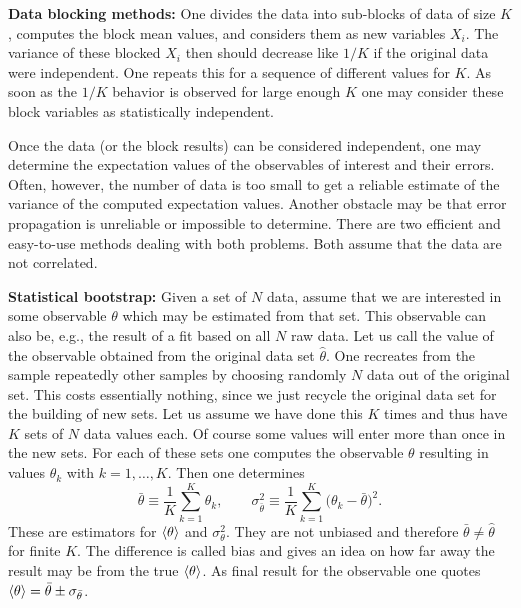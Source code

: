 \textbf{Data blocking methods:} One divides the data into sub-blocks of data of
size $K$, computes the block mean values, and considers them as new variables $X_i$. The variance of these blocked $X_i$ then should decrease like $1/K$
if the original data were independent. One repeats this for a sequence
of different values for $K$. As soon as the $1/K$ behavior is observed for
large enough $K$ one may consider these block variables as statistically
independent.

Once the data (or the block results) can be considered independent, one
may determine the expectation values of the observables of interest and their
errors. Often, however, the number of data is too small to get a reliable estimate of the variance of the computed expectation values. Another obstacle
may be that error propagation is unreliable or impossible to determine. There
are two efficient and easy-to-use methods dealing with both problems. Both
assume that the data are not correlated.

\textbf{Statistical bootstrap:} Given a set of $N$ data, assume that we are interested
in some observable $\theta$ which may be estimated from that set. This observable can also be, e.g., the result of a fit based on all $N$ raw data. Let us
call the value of the observable obtained from the original data set $\hat{\theta}$.
One recreates from the sample repeatedly other samples by choosing randomly
$N$ data out of the original set. This costs essentially nothing, since we just
recycle the original data set for the building of new sets. Let us assume
we have done this $K$ times and thus have $K$ sets of $N$ data values each.
Of course some values will enter more than once in the new sets. For each
of these sets one computes the observable $\theta$ resulting in values $\theta_k$ with
$k = 1, \ldots, K$. Then one determines
\begin{equation}
  \bar{\theta} \equiv \frac{1}{K}\sum_{k=1}^{K}\theta_k, \qquad
  \sigma_{\bar{\theta}}^2 \equiv \frac{1}{K}\sum_{k=1}^{K}\big(\theta_k - \bar{\theta}\big)^2 .
\end{equation}
These are estimators for $\left\langle \theta \right\rangle$ and $\sigma_\theta^2$. They are not unbiased and therefore
$\bar{\theta} \neq \hat{\theta}$ for finite $K$. The difference is called bias and gives an idea on
how far away the result may be from the true $\left\langle \theta \right\rangle$. As final result for the
observable one quotes $\left\langle \theta \right\rangle = \bar{\theta} \pm \sigma_{\bar{\theta}}$.

